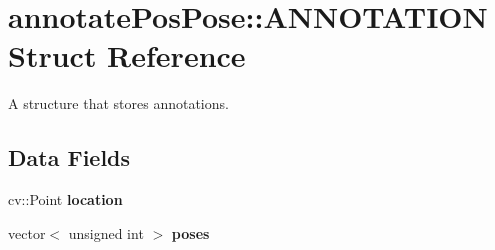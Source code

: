 \hypertarget{structannotatePosPose_1_1ANNOTATION}{
\section{annotatePosPose::ANNOTATION Struct Reference}
\label{structannotatePosPose_1_1ANNOTATION}
}


A structure that stores annotations.  


\subsection*{Data Fields}
\begin{DoxyCompactItemize}
\item 
\hypertarget{structannotatePosPose_1_1ANNOTATION_aaba89cd13e82e5dca7e8dd511471a1a3}{
cv::Point {\bfseries location}}
\label{structannotatePosPose_1_1ANNOTATION_aaba89cd13e82e5dca7e8dd511471a1a3}

\item 
\hypertarget{structannotatePosPose_1_1ANNOTATION_ae9f38c008635e98afd7fd8ffa8377d92}{
vector$<$ unsigned int $>$ {\bfseries poses}}
\label{structannotatePosPose_1_1ANNOTATION_ae9f38c008635e98afd7fd8ffa8377d92}

\end{DoxyCompactItemize}
